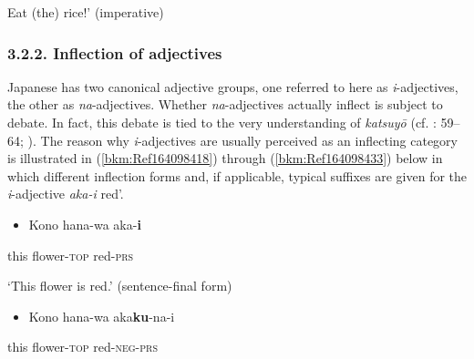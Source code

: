 \documentclass[output=paper]{langscibook}
\begin{document}
\begin{styleBeispielCinqueKapitel}
{\textasciigrave}Eat (the) rice!’      (imperative)
\end{styleBeispielCinqueKapitel}

\subsubsection{3.2.2. Inflection of adjectives}

Japanese has two canonical adjective groups, one referred to here as \textit{i}{}-adjectives, the other as \textit{na}{}-adjectives. Whether \textit{na}{}-adjectives actually inflect is subject to debate. In fact, this debate is tied to the very understanding of \textit{katsuyō} (cf. \citealt{Uehara1998}: 59–64; \citealt{KishimotoUehara2016}). The reason why \textit{i}{}-adjectives are usually perceived as an inflecting category is illustrated in (\ref{bkm:Ref164098418}) through (\ref{bkm:Ref164098433}) below in which different inflection forms and, if applicable, typical suffixes are given for the \textit{i}{}-adjective \textit{aka-i} {\textasciigrave}red’.

\begin{itemize}
\item \begin{styleBeispielCinqueKapitel}
\label{bkm:Ref164098418}Kono hana-wa aka-\textbf{i}
\end{styleBeispielCinqueKapitel}
\end{itemize}
\begin{styleBeispielCinqueKapitel}
this flower-\textsc{top} red-\textsc{prs}
\end{styleBeispielCinqueKapitel}

\begin{styleBeispielCinqueKapitel}
‘This flower is red.’     (sentence-final form)
\end{styleBeispielCinqueKapitel}

\begin{itemize}
\item \begin{styleBeispielCinqueKapitel}
Kono hana-wa aka\textbf{ku}{}-na-i
\end{styleBeispielCinqueKapitel}
\end{itemize}
\begin{styleBeispielCinqueKapitel}
this flower-\textsc{top} red-\textsc{neg}{}-\textsc{prs}
\end{styleBeispielCinqueKapitel}
\end{document}
